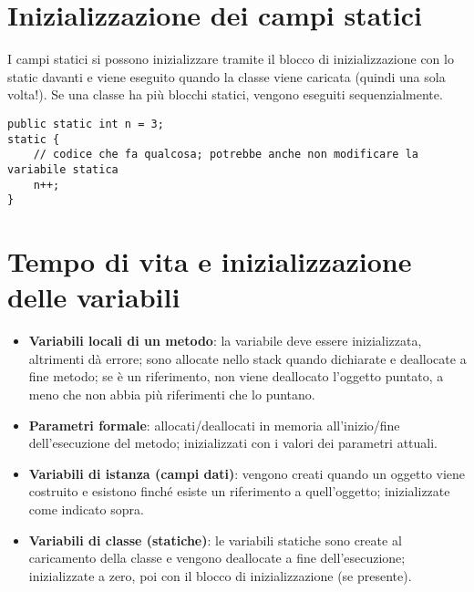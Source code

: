 \section{Inizializzazione dei campi statici}
I campi statici si possono inizializzare tramite il blocco di inizializzazione con lo static davanti e viene eseguito quando la classe viene caricata (quindi una sola volta!). Se una classe ha più blocchi statici, vengono eseguiti sequenzialmente.

\begin{lstlisting}
public static int n = 3;
static {
	// codice che fa qualcosa; potrebbe anche non modificare la variabile statica
	n++;
}
\end{lstlisting}

\section{Tempo di vita e inizializzazione delle variabili}
\begin{itemize}
\item \textbf{Variabili locali di un metodo}: la variabile deve essere inizializzata, altrimenti dà errore; sono allocate nello stack quando dichiarate e deallocate a fine metodo; se è un riferimento, non viene deallocato l'oggetto puntato, a meno che non abbia più riferimenti che lo puntano. 
\item \textbf{Parametri formale}: allocati/deallocati in memoria all'inizio/fine dell'esecuzione del metodo; inizializzati con i valori dei parametri attuali.
\item \textbf{Variabili di istanza (campi dati)}: vengono creati quando un oggetto viene costruito e esistono finché esiste un riferimento a quell'oggetto; inizializzate come indicato sopra. 
\item \textbf{Variabili di classe (statiche)}: le variabili statiche sono create al caricamento della classe e vengono deallocate a fine dell'esecuzione; inizializzate a zero, poi con il blocco di inizializzazione (se presente).
\end{itemize}
